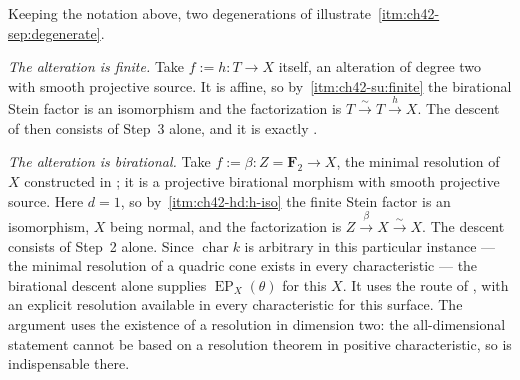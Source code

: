 \begin{example}
\label{ex:ch42-stein-degenerate}
Keeping the notation above, two degenerations of
 illustrate
\,\cref{itm:ch42-sep:degenerate}.

\emph{The alteration is finite.}  Take $f:=h:T\to X$ itself, an alteration
of degree two with smooth projective source.  It is affine, so by
\,\cref{itm:ch42-su:finite} the birational
Stein factor is an isomorphism and the factorization is
$T\xrightarrow{\sim}T\xrightarrow{h}X$.  The descent of
 then consists of Step~3 alone, and it is
exactly .

\emph{The alteration is birational.}  Take $f:=\beta:Z=\mathbf F_2\to X$,
the minimal resolution of $X$ constructed in
; it is a projective birational morphism with
smooth projective source.  Here $d=1$, so by
\,\cref{itm:ch42-hd:h-iso} the finite Stein factor is
an isomorphism, $X$ being normal, and the factorization is
$Z\xrightarrow{\beta}X\xrightarrow{\sim}X$.  The descent consists of
Step~2 alone.  Since $\operatorname{char}k$ is arbitrary in this
particular instance --- the minimal resolution of a quadric cone exists in
every characteristic --- the birational descent alone supplies
$\operatorname{EP}_X(\theta)$ for this $X$.
It uses the route of , with an
explicit resolution available in every characteristic for this surface.
The argument uses the existence of a resolution in dimension two: the all-dimensional statement cannot be based on a
resolution theorem in positive characteristic, so
 is indispensable there.
\end{example}

